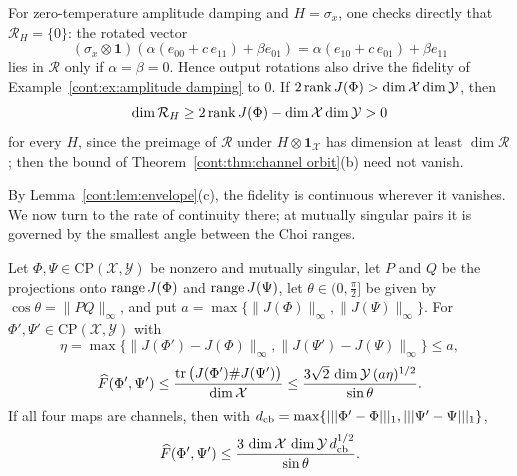 For zero-temperature amplitude damping and $H=\sigma_x$, one checks directly that $\mathcal{R}_H=\{0\}$: the rotated vector
\[
(\sigma_x\otimes\mathbf{1})(\alpha(e_{00}+c\,e_{11})+\beta e_{01})=\alpha(e_{10}+c\,e_{01})+\beta e_{11}
\]
lies in $\mathcal{R}$ only if $\alpha=\beta=0$. Hence output rotations also drive the fidelity of Example~\ref{cont:ex:amplitude damping} to $0$. If $2\operatorname{rank} J(\Phi)>\dim\mathcal{X}\dim\mathcal{Y}$, then
\[
\dim\mathcal{R}_H\geq2\operatorname{rank} J(\Phi)-\dim\mathcal{X}\dim\mathcal{Y}>0
\]
for every $H$, since the preimage of $\mathcal{R}$ under $H\otimes\mathbf{1}_{\mathcal{X}}$ has dimension at least $\dim\mathcal{R}$; then the bound of Theorem~\ref{cont:thm:channel orbit}(b) need not vanish.

By Lemma~\ref{cont:lem:envelope}(c), the fidelity is continuous wherever it vanishes. We now turn to the rate of continuity there; at mutually singular pairs it is governed by the smallest angle between the Choi ranges.

\begin{theorem}\label{cont:thm:singular rate}
Let $\Phi,\Psi\in\mathrm{CP}(\mathcal{X},\mathcal{Y})$ be nonzero and mutually singular, let $P$ and $Q$ be the projections onto $\operatorname{range} J(\Phi)$ and $\operatorname{range} J(\Psi)$, let $\theta\in(0,\frac\pi2]$ be given by $\cos\theta=\|PQ\|_\infty$, and put $a=\max\{\|J(\Phi)\|_\infty,\|J(\Psi)\|_\infty\}$. For $\Phi',\Psi'\in\mathrm{CP}(\mathcal{X},\mathcal{Y})$ with
\[
\eta=\max\{\|J(\Phi')-J(\Phi)\|_\infty,\|J(\Psi')-J(\Psi)\|_\infty\}\leq a,
\]
\[
\widehat{F}(\Phi',\Psi')\leq\frac{\operatorname{tr}\big(J(\Phi')\#J(\Psi')\big)}{\dim\mathcal{X}}\leq\frac{3\sqrt2\,\dim\mathcal{Y}\,(a\eta)^{1/2}}{\sin\theta}.
\]
If all four maps are channels, then with $d_{\rm cb}=\max\{|||\Phi'-\Phi|||_1,|||\Psi'-\Psi|||_1\}$,
\[
\widehat{F}(\Phi',\Psi')\leq\frac{3\,\dim\mathcal{X}\,\dim\mathcal{Y}\,d_{\rm cb}^{1/2}}{\sin\theta}.
\]
\end{theorem}


